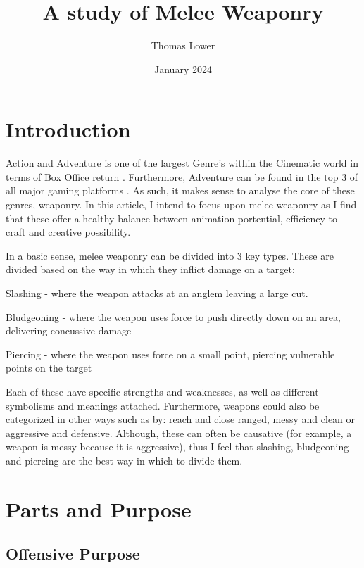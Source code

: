 \documentclass{article}
\title{A study of Melee Weaponry}
\author{Thomas Lower}
\date{January 2024}
\begin{document}
\maketitle

\pagebreak

\tableofcontents

\pagebreak

\section{Introduction}
Action and Adventure is one of the largest Genre's within the Cinematic world in terms of Box Office return \parencite{1}. Furthermore, Adventure can be found in the top 3 of all major gaming platforms \parencite{2}. As such, it makes sense to analyse the core of these genres, weaponry. In this article, I intend to focus upon melee weaponry as I find that these offer a healthy balance between animation portential, efficiency to craft and creative possibility.


In a basic sense, melee weaponry can be divided into 3 key types. These are divided based on the way in which they inflict damage on a target:
\begin{list}{-}{}
    \item Slashing - where the weapon attacks at an anglem leaving a large cut.
    \item Bludgeoning - where the weapon uses force to push directly down on an area, delivering concussive damage
    \item Piercing - where the weapon uses force on a small point, piercing vulnerable points on the target
\end{list}
\parencite{bozkir2024just}

Each of these have specific strengths and weaknesses, as well as different symbolisms and meanings attached. Furthermore, weapons could also be categorized in other ways such as by: reach and close ranged, messy and clean or aggressive and defensive. Although, these can often be causative (for example, a weapon is messy because it is aggressive), thus I feel that slashing, bludgeoning and piercing are the best way in which to divide them.

\pagebreak
\section{Parts and Purpose}

\subsection{Offensive Purpose}
\end{document}
